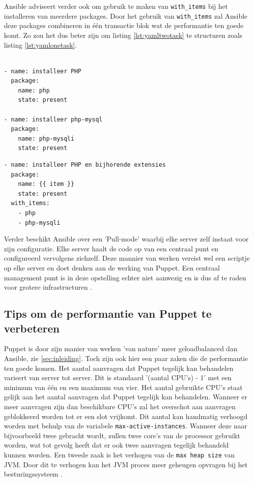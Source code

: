 Ansible adviseert verder ook om gebruik te maken van \texttt{with\_items} bij het installeren van meerdere packages. Door het gebruik van \texttt{with\_items} zal Ansible deze packages combineren in \'e\'en transactie blok wat de performantie ten goede komt. Zo zou het dus beter zijn om listing \ref{lst:yamltwotask} te structuren zoals listing \ref{lst:yamlonetask}. 


\begin{lstlisting}[frame=single]

- name: installeer PHP
  package:
    name: php
    state: present

- name: installeer php-mysql
  package:
    name: php-mysqli
    state: present
\end{lstlisting}

\begin{lstlisting}[frame=single]
- name: installeer PHP en bijhorende extensies
  package:
    name: {{ item }}
    state: present
  with_items:
    - php
    - php-mysqli
\end{lstlisting}

  Verder beschikt Ansible over een 'Pull-mode' waarbij elke server zelf instaat voor zijn configuratie. Elke server haalt de code op van een centraal punt en configureerd vervolgens zichzelf. Deze mannier van werken vereist wel een scriptje op elke server en doet denken aan de werking van Puppet. Een centraal management punt is in deze opstelling echter niet aanwezig en is dus af te raden voor grotere infrastructuren \autocite{AnsibleTuning} .
  
 \subsection{Tips om de performantie van Puppet te verbeteren}
 Puppet is door zijn manier van werken 'van nature' meer geloadbalanced dan Ansible, zie \ref{sec:inleiding}. Toch zijn ook hier een paar zaken die de performantie ten goede komen. Het aantal aanvragen dat Puppet tegelijk kan behandelen varieert van server tot server. Dit is standaard '(aantal CPU's) - 1' met een minimum van \'e\'en en een maximum van vier. Het aantal gebruikte CPU's staat gelijk aan het aantal aanvragen dat Puppet tegelijk kan behandelen. Wanneer er meer aanvragen zijn dan beschikbare CPU's zal het overschot aan aanvragen geblokkeerd worden tot er een slot vrijkomt. Dit aantal kan handmatig verhoogd worden met behulp van de variabele \texttt{max-active-instances}. Wanneer deze naar bijvoorbeeld twee gebracht wordt, zullen twee core's van de processor gebruikt worden, wat tot gevolg heeft dat er ook twee aanvragen tegelijk behandeld kunnen worden. \newline
 Een tweede zaak is het verhogen van de \texttt{max heap size} van JVM. Door dit te verhogen kan het JVM proces meer geheugen opvragen bij het besturingssysteem \autocite{PuppetTuning}.
 
